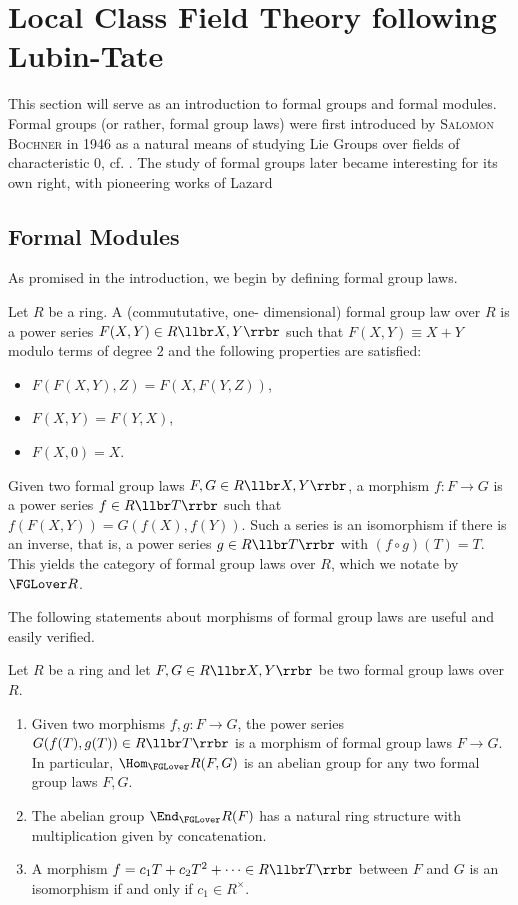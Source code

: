\documentclass[../main.tex]{subfiles}
\begin{document}
\section{Local Class Field Theory following Lubin-Tate}


This section will serve as an introduction to formal groups and 
formal modules. Formal groups (or rather, formal group laws) were first
introduced by \textsc{Salomon Bochner} in 1946 as a natural means of studying Lie
Groups over fields of characteristic $0$, cf. \cite{Bochner1946FGrps}. 
The study of formal groups later became interesting for its own right, 
with pioneering works of Lazard \cite{Lazard1955FGrps}

\subsection{Formal Modules} %
\label{sub:Formal Modules}
As promised in the introduction, we begin by defining {formal group
laws}.

\begin{defi}
    Let $R$ be a ring. A (commututative, one-\allowbreak
    dimen\-sional) formal group law over $R$ is a power series $F(X,Y) \in
    R\llbr X, Y \rrbr$ such that $F(X,Y) \equiv X + Y$ modulo terms
    of degree $2$ and
    the following properties are satisfied:
    \begin{itemize}
        \item $F(F(X,Y),Z) = F(X,F(Y,Z))$,
        \item $F(X,Y) = F(Y,X)$,
        \item $F(X,0) = X$.
    \end{itemize}
\end{defi}
Given two formal group laws $F, G \in R\llbr X,Y\rrbr$, a morphism
$f: F\to G$ is a 
power series $f \in R\llbr T \rrbr$ such that $f(F(X,Y)) = G(f(X),f(Y))$.
Such a series is an isomorphism if there is an {inverse}, that
is, a power series $g \in R\llbr T \rrbr$ with $(f \circ g)(T) = T$.
This yields the category of formal group laws over $R$, which we notate by
$\FGLover R$.

The following statements about morphisms of formal group laws are 
useful and easily verified.
\begin{lem}\label{lem:FGLeasyfacts}
  Let $R$ be a ring and let $F,G \in R\llbr X,Y\rrbr$ be two formal
  group laws over $R$. 
  \begin{enumerate}
    \item Given two morphisms $f,g : F \to G$, the power series $G(f(T), g(T))
      \in R\llbr T \rrbr$ is a morphism of formal group laws 
      $F \to G$. In particular, $\Hom_\FGLover R(F,G)$ is an abelian
      group for any two formal group laws $F,G$.
    \item The abelian group $\End_\FGLover R(F)$ has a natural ring structure
      with multiplication given by concatenation.
    \item A morphism $f = c_1 T + c_2 T^2 + \dots \in R\llbr T \rrbr$ between
      $F$ and $G$ is an isomorphism if and only if $c_1 \in R^\times$.
  \end{enumerate}
\end{lem}
\end{document}
